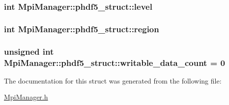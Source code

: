 \subsubsection[{\texorpdfstring{level}{level}}]{\setlength{\rightskip}{0pt plus 5cm}int Mpi\+Manager\+::phdf5\+\_\+struct\+::level}\hypertarget{struct_mpi_manager_1_1phdf5__struct_aa3f8cc807724b61ef3a37509f71100ab}{}\label{struct_mpi_manager_1_1phdf5__struct_aa3f8cc807724b61ef3a37509f71100ab}
\subsubsection[{\texorpdfstring{region}{region}}]{\setlength{\rightskip}{0pt plus 5cm}int Mpi\+Manager\+::phdf5\+\_\+struct\+::region}\hypertarget{struct_mpi_manager_1_1phdf5__struct_a1a9978693d5b50cb83b8ccc78fb23a6d}{}\label{struct_mpi_manager_1_1phdf5__struct_a1a9978693d5b50cb83b8ccc78fb23a6d}
\subsubsection[{\texorpdfstring{writable\+\_\+data\+\_\+count}{writable_data_count}}]{\setlength{\rightskip}{0pt plus 5cm}unsigned int Mpi\+Manager\+::phdf5\+\_\+struct\+::writable\+\_\+data\+\_\+count = 0}\hypertarget{struct_mpi_manager_1_1phdf5__struct_a5b487966cec847dfba96a869e9adb7f0}{}\label{struct_mpi_manager_1_1phdf5__struct_a5b487966cec847dfba96a869e9adb7f0}


The documentation for this struct was generated from the following file\+:\begin{DoxyCompactItemize}
\item 
\hyperlink{_mpi_manager_8h}{Mpi\+Manager.\+h}\end{DoxyCompactItemize}
